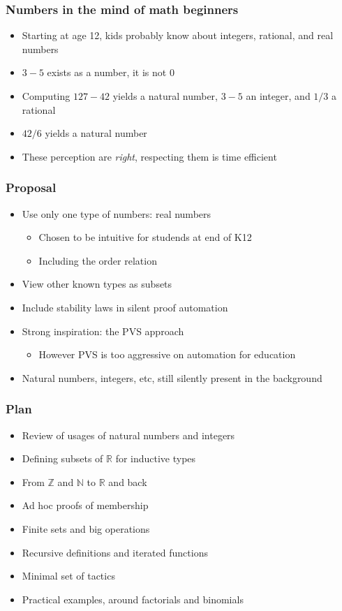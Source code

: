 \documentclass[compress]{beamer}
\begin{document}
\begin{frame}
\frametitle{Numbers in the mind of math beginners}
\begin{itemize}
\item Starting at age 12, kids probably know about integers, rational, and
real numbers
\item \(3 - 5\) exists as a number, it is not 0
\item Computing \(127 - 42\) yields a natural number, \(3 - 5\) an integer,
and \(1 / 3\) a rational
\item \(42 / 6\) yields a natural number
\item These perception are {\em right}, respecting them is time efficient
\end{itemize}
\end{frame}
\begin{frame}
\frametitle{Proposal}
\begin{itemize}
\item Use only one type of numbers: real numbers
\begin{itemize}
\item Chosen to be intuitive for studends at end of K12
\item Including the order relation
\end{itemize}
\item View other known types as subsets
\item Include stability laws in silent proof automation
\item Strong inspiration: the PVS approach
\begin{itemize}
\item However PVS is too aggressive on automation for education
\end{itemize}
\item Natural numbers, integers, etc, still silently present in the background
\end{itemize}
\end{frame}
\begin{frame}
\frametitle{Plan}
\begin{itemize}
\item Review of usages of natural numbers and integers
\item Defining subsets of \(\mathbb R\) for inductive types
\item From \(\mathbb Z\) and \(\mathbb N\) to \(\mathbb R\) and back
\item Ad hoc proofs of membership
\item Finite sets and big operations
\item Recursive definitions and iterated functions
\item Minimal set of tactics
\item Practical examples, around factorials and binomials
\end{itemize}
\end{frame}
\end{document}
